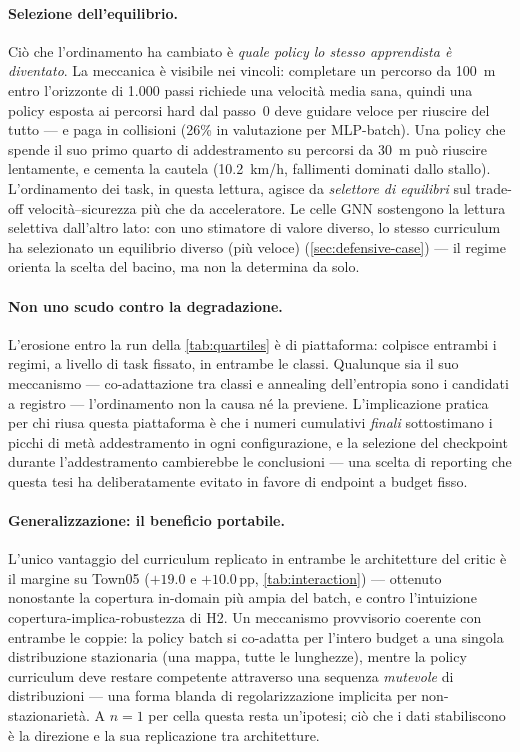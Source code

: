 \paragraph{Selezione dell'equilibrio.}
Ciò che l'ordinamento ha cambiato è \emph{quale policy lo stesso
apprendista è diventato}. La meccanica è visibile nei vincoli:
completare un percorso da \SI{100}{m} entro l'orizzonte di 1{.}000
passi richiede una velocità media sana, quindi una policy esposta ai
percorsi hard dal passo~0 deve guidare veloce per riuscire del tutto
--- e paga in collisioni (26\% in valutazione per MLP-batch). Una
policy che spende il suo primo quarto di addestramento su percorsi da
\SI{30}{m} può riuscire lentamente, e cementa la cautela (10.2~km/h,
fallimenti dominati dallo stallo). L'ordinamento dei task, in questa
lettura, agisce da \emph{selettore di equilibri} sul trade-off
velocità--sicurezza più che da acceleratore. Le celle GNN sostengono la
lettura selettiva dall'altro lato: con uno stimatore di valore diverso,
lo stesso curriculum ha selezionato un equilibrio diverso (più veloce)
(\cref{sec:defensive-case}) --- il regime orienta la scelta del bacino,
ma non la determina da solo.

\paragraph{Non uno scudo contro la degradazione.}
L'erosione entro la run della \cref{tab:quartiles} è di piattaforma:
colpisce entrambi i regimi, a livello di task fissato, in entrambe le
classi. Qualunque sia il suo meccanismo --- co-adattazione tra classi e
annealing dell'entropia sono i candidati a registro --- l'ordinamento
non la causa né la previene. L'implicazione pratica per chi riusa
questa piattaforma è che i numeri cumulativi \emph{finali} sottostimano
i picchi di metà addestramento in ogni configurazione, e la selezione
del checkpoint durante l'addestramento cambierebbe le conclusioni ---
una scelta di reporting che questa tesi ha deliberatamente evitato in
favore di endpoint a budget fisso.

\paragraph{Generalizzazione: il beneficio portabile.}
L'unico vantaggio del curriculum replicato in entrambe le architetture
del critic è il margine su Town05 ($+19.0$ e $+10.0$\,pp,
\cref{tab:interaction}) --- ottenuto nonostante la copertura in-domain
più ampia del batch, e contro l'intuizione
copertura-implica-robustezza di H2. Un meccanismo provvisorio coerente
con entrambe le coppie: la policy batch si co-adatta per l'intero
budget a una singola distribuzione stazionaria (una mappa, tutte le
lunghezze), mentre la policy curriculum deve restare competente
attraverso una sequenza \emph{mutevole} di distribuzioni --- una forma
blanda di regolarizzazione implicita per non-stazionarietà. A $n{=}1$
per cella questa resta un'ipotesi; ciò che i dati stabiliscono è la
direzione e la sua replicazione tra architetture.

